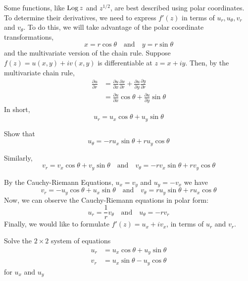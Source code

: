 \documentclass[handout]{ximera}
\begin{document}
Some functions, like $\operatorname{Log} z$ and $z^{1/2}$, are best described using polar coordinates. To determine their derivatives, we need 
to express $f'(z)$ in terms of $u_r, u_\theta, v_r$ and $v_\theta$. To do this, we will take advantage of the polar coordinate transformations,
\[
x = r\cos \theta \quad \mbox{and} \quad y=r\sin \theta
\]
and the multivariate version of the chain rule.
Suppose $f(z) = u(x,y) + iv(x,y)$ is differentiable at $z = x+iy$.
Then, by the multivariate chain rule,
\begin{align*}
\frac{\partial u}{\partial r} &= \frac{\partial u}{\partial x}\frac{\partial x}{\partial r}+\frac{\partial u}{\partial y}\frac{\partial y}{\partial r}\\
                              &= \frac{\partial u}{\partial x} \cos\theta + \frac{\partial u}{\partial y} \sin \theta
\end{align*}
In short,
\[
u_r = u_x \cos \theta + u_y \sin\theta
\]


\begin{problem}
Show that
\[
u_\theta = -ru_x \sin \theta + ru_y \cos\theta
\]
\end{problem}


Similarly,
\[
 v_r = v_x \cos \theta + v_y \sin\theta \quad \mbox{and} \quad  v_\theta = -rv_x \sin \theta + rv_y \cos\theta
\]

By the Cauchy-Riemann Equations, $u_x = v_y$ and $u_y = -v_x$ we have
\[
v_r = -u_y \cos \theta + u_x \sin\theta \quad \mbox{and} \quad  v_\theta = ru_y \sin \theta + ru_x \cos\theta
\]
Now, we can observe the Cauchy-Riemann equations in polar form:
\[
u_r = \frac{1}{r} v_\theta \quad \mbox{and} \quad u_\theta = -rv_r
\]
Finally, we would like to formulate $f'(z) = u_x + iv_x$, in terms of $u_r$ and $v_r$.


\begin{problem} Solve the $2 \times 2$ system of equations
\begin{align*}
u_r &= u_x \cos \theta + u_y \sin\theta\\
v_r &= u_x \sin \theta -u_y \cos\theta
\end{align*}
for $u_x$ and $u_y$
\begin{multipleChoice}
\end{multipleChoice}
\end{problem}
\end{document}
